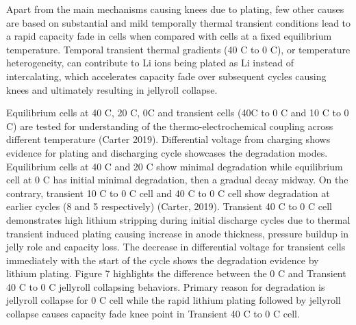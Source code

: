 \documentclass{article}
\begin{document}
Apart from the main mechanisms causing knees due to plating, few other causes are based on substantial and mild temporally thermal transient conditions lead to a rapid capacity fade in cells when compared with cells at a fixed equilibrium temperature. Temporal transient thermal gradients (40 \degree C to 0 \degree C), or temperature heterogeneity, can contribute to Li ions being plated as Li instead of intercalating, which accelerates capacity fade over subsequent cycles causing knees and ultimately resulting in jellyroll collapse.

Equilibrium cells at 40 \degree C, 20 \degree C, 0\degree C and transient cells (40\degree C to 0 \degree C and 10 \degree C to 0 \degree C) are tested for understanding of the thermo-electrochemical coupling across different temperature (Carter 2019). Differential voltage from charging shows evidence for plating and discharging cycle showcases the degradation modes. Equilibrium cells at 40 \degree C and 20 \degree C show minimal degradation while equilibrium cell at 0 \degree C has initial minimal degradation, then a gradual decay midway. On the contrary, transient 10 \degree C to 0 \degree C cell and 40 \degree C to 0 \degree C cell show degradation at earlier cycles (8 and 5 respectively) (Carter, 2019). Transient 40 \degree C to 0 \degree C cell demonstrates high lithium stripping during initial discharge cycles due to thermal transient induced plating causing increase in anode thickness, pressure buildup in jelly role and capacity loss. The decrease in differential voltage for transient cells immediately with the start of the cycle shows the degradation evidence by lithium plating.  Figure 7 highlights the difference between the 0 \degree C and Transient 40 \degree C to 0 \degree C jellyroll collapsing behaviors. Primary reason for degradation is jellyroll collapse for 0 \degree C cell while the rapid lithium plating followed by jellyroll collapse causes capacity fade knee point in Transient 40 \degree C to 0 \degree C cell. 
\end{document}
